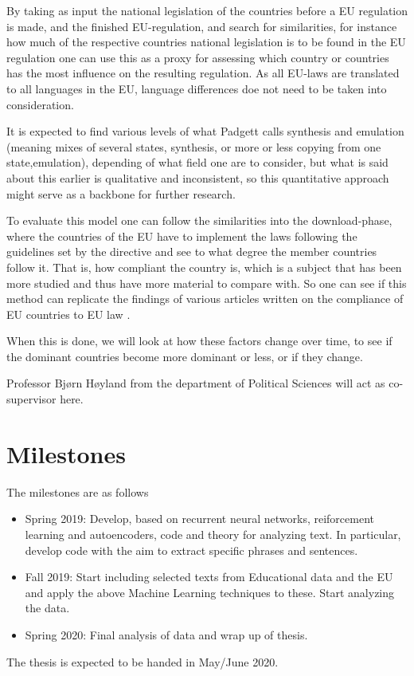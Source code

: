 \documentclass{article}
\begin{document}
By taking as input the national legislation of the countries before a
EU regulation is made, and the finished EU-regulation, and search for
similarities, for instance how much of the respective countries
national legislation is to be found in the EU regulation one can use
this as a proxy for assessing which country or countries has the most
influence on the resulting regulation. As all EU-laws are translated
to all languages in the EU, language differences doe not need to be
taken into consideration.


It is expected to find various levels of what Padgett calls synthesis
and emulation \citep{Padgett} (meaning mixes of several states,
synthesis, or more or less copying from one state,emulation),
depending of what field one are to consider, but what is said about
this earlier is qualitative and inconsistent, so this quantitative
approach might serve as a backbone for further research.

To evaluate this model one can follow the similarities into the
download-phase, where the countries of the EU have to implement the
laws following the guidelines set by the directive and see to what
degree the member countries follow it. That is, how compliant the
country is, which is a subject that has been more studied and thus
have more material to compare with. So one can see if this method can
replicate the findings of various articles written on the compliance
of EU countries to EU law \citep{Toshkov} \citep{Tanja}
\citep{toshkov2} \citep{thoman}.

When this is done, we will look at how these factors change over time, to see if the dominant countries become more dominant or less, or if they change. 

Professor Bj\o rn H\o yland from the department of Political Sciences will act as co-supervisor here.

\section{Milestones}

The milestones are as follows
\begin{itemize}
\item Spring 2019: Develop, based on recurrent neural networks, reiforcement learning  and autoencoders, code and theory for analyzing text. In particular, develop code with the aim to extract specific phrases and sentences. 

\item Fall 2019: Start including selected texts from Educational data and the EU and apply the above Machine Learning techniques to these. Start analyzing the data.
\item Spring 2020: Final analysis of data and wrap up of thesis. 
\end{itemize}
The thesis is expected to be handed in May/June  2020.






\end{document}
